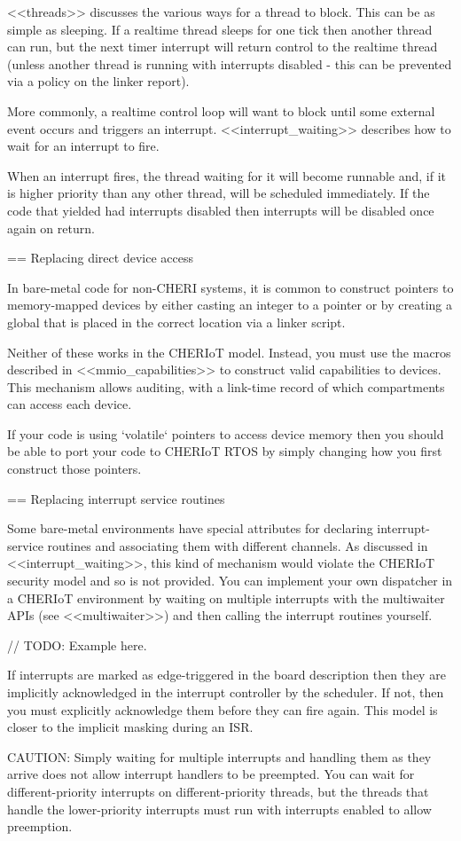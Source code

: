 <<threads>> discusses the various ways for a thread to block.
This can be as simple as sleeping.
If a realtime thread sleeps for one tick then another thread can run, but the next timer interrupt will return control to the realtime thread (unless another thread is running with interrupts disabled - this can be prevented via a policy on the linker report).

More commonly, a realtime control loop will want to block until some external event occurs and triggers an interrupt.
<<interrupt_waiting>> describes how to wait for an interrupt to fire.

When an interrupt fires, the thread waiting for it will become runnable and, if it is higher priority than any other thread, will be scheduled immediately.
If the code that yielded had interrupts disabled then interrupts will be disabled once again on return.

== Replacing direct device access

In bare-metal code for non-CHERI systems, it is common to construct pointers to memory-mapped devices by either casting an integer to a pointer or by creating a global that is placed in the correct location via a linker script.

Neither of these works in the CHERIoT model.
Instead, you must use the macros described in <<mmio_capabilities>> to construct valid capabilities to devices.
This mechanism allows auditing, with a link-time record of which compartments can access each device.

If your code is using `volatile` pointers to access device memory then you should be able to port your code to CHERIoT RTOS by simply changing how you first construct those pointers.

== Replacing interrupt service routines

Some bare-metal environments have special attributes for declaring interrupt-service routines and associating them with different channels.
As discussed in <<interrupt_waiting>>, this kind of mechanism would violate the CHERIoT security model and so is not provided.
You can implement your own dispatcher in a CHERIoT environment by waiting on multiple interrupts with the multiwaiter APIs (see <<multiwaiter>>) and then calling the interrupt routines yourself.

// TODO: Example here.

If interrupts are marked as edge-triggered in the board description then they are implicitly acknowledged in the interrupt controller by the scheduler.
If not, then you must explicitly acknowledge them before they can fire again.
This model is closer to the implicit masking during an ISR.

CAUTION: Simply waiting for multiple interrupts and handling them as they arrive does not allow interrupt handlers to be preempted.
You can wait for different-priority interrupts on different-priority threads, but the threads that handle the lower-priority interrupts must run with interrupts enabled to allow preemption.
